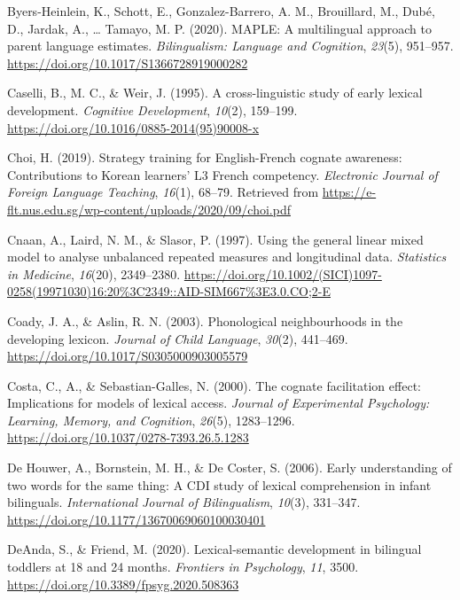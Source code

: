 \documentclass[
  ,man,floatsintext]{apa6}
\newlength{\cslhangindent}
\newlength{\cslentryspacingunit} %
\newenvironment{CSLReferences}[2] %
 {%
  \setlength{\parindent}{0pt}
  \ifodd #1
  \let\oldpar\par
  \def\par{\hangindent=\cslhangindent\oldpar}
  \fi
  \setlength{\parskip}{#2\cslentryspacingunit}
 }%
 {}
\begin{document}
\begin{CSLReferences}{1}{0}
\leavevmode{}%
Byers-Heinlein, K., Schott, E., Gonzalez-Barrero, A. M., Brouillard, M., Dubé, D., Jardak, A., \ldots{} Tamayo, M. P. (2020). MAPLE: A multilingual approach to parent language estimates. \emph{Bilingualism: Language and Cognition}, \emph{23}(5), 951--957. \url{https://doi.org/10.1017/S1366728919000282}

\leavevmode{}%
Caselli, B., M. C., \& Weir, J. (1995). A cross-linguistic study of early lexical development. \emph{Cognitive Development}, \emph{10}(2), 159--199. \url{https://doi.org/10.1016/0885-2014(95)90008-x}

\leavevmode{}%
Choi, H. (2019). Strategy training for {E}nglish-{F}rench cognate awareness: Contributions to {K}orean learners' L3 {F}rench competency. \emph{Electronic Journal of Foreign Language Teaching}, \emph{16}(1), 68--79. Retrieved from \url{https://e-flt.nus.edu.sg/wp-content/uploads/2020/09/choi.pdf}

\leavevmode{}%
Cnaan, A., Laird, N. M., \& Slasor, P. (1997). Using the general linear mixed model to analyse unbalanced repeated measures and longitudinal data. \emph{Statistics in Medicine}, \emph{16}(20), 2349--2380. \url{https://doi.org/10.1002/(SICI)1097-0258(19971030)16:20\%3C2349::AID-SIM667\%3E3.0.CO;2-E}

\leavevmode{}%
Coady, J. A., \& Aslin, R. N. (2003). Phonological neighbourhoods in the developing lexicon. \emph{Journal of Child Language}, \emph{30}(2), 441--469. \url{https://doi.org/10.1017/S0305000903005579}

\leavevmode{}%
Costa, C., A., \& Sebastian-Galles, N. (2000). The cognate facilitation effect: Implications for models of lexical access. \emph{Journal of Experimental Psychology: Learning, Memory, and Cognition}, \emph{26}(5), 1283--1296. \url{https://doi.org/10.1037/0278-7393.26.5.1283}

\leavevmode{}%
De Houwer, A., Bornstein, M. H., \& De Coster, S. (2006). Early understanding of two words for the same thing: A {CDI} study of lexical comprehension in infant bilinguals. \emph{International Journal of Bilingualism}, \emph{10}(3), 331--347. \url{https://doi.org/10.1177/13670069060100030401}

\leavevmode{}%
DeAnda, S., \& Friend, M. (2020). Lexical-semantic development in bilingual toddlers at 18 and 24 months. \emph{Frontiers in Psychology}, \emph{11}, 3500. \url{https://doi.org/10.3389/fpsyg.2020.508363}


\end{CSLReferences}
\end{document}
